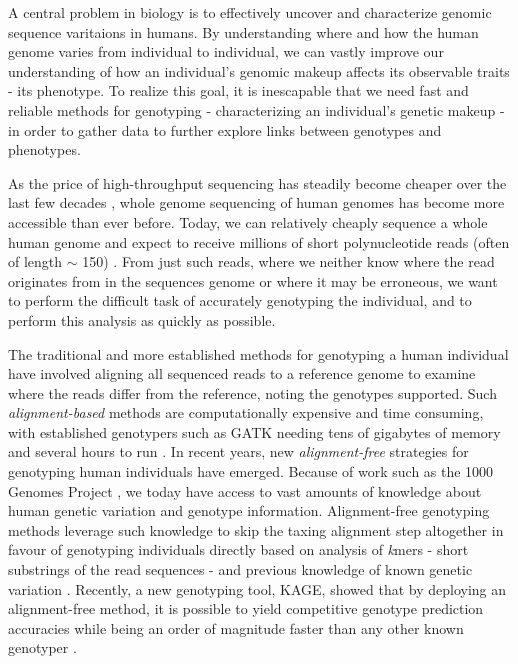 A central problem in biology is to effectively uncover and characterize genomic sequence varitaions in humans.
By understanding where and how the human genome varies from individual to individual, we can vastly improve our understanding of how an individual's genomic makeup affects its observable traits - its phenotype.
To realize this goal, it is inescapable that we need fast and reliable methods for genotyping - characterizing an individual's genetic makeup - in order to gather data to further explore links between genotypes and phenotypes.

As the price of high-throughput sequencing has steadily become cheaper over the last few decades \cite{nhgri_sequencing_cost}, whole genome sequencing of human genomes has become more accessible than ever before.
Today, we can relatively cheaply sequence a whole human genome and expect to receive millions of short polynucleotide reads (often of length $\sim$ 150) \cite{illumina_read_length}.
From just such reads, where we neither know where the read originates from in the sequences genome or where it may be erroneous, we want to perform the difficult task of accurately genotyping the individual, and to perform this analysis as quickly as possible.

The traditional and more established methods for genotyping a human individual have involved aligning all sequenced reads to a reference genome to examine where the reads differ from the reference, noting the genotypes supported.
Such \textit{alignment-based} methods are computationally expensive and time consuming, with established genotypers such as GATK \cite{gatk} needing tens of gigabytes of memory and several hours to run \cite{kage}.
In recent years, new \textit{alignment-free} strategies for genotyping human individuals have emerged.
Because of work such as the 1000 Genomes Project \cite{1000_genomes_project}, we today have access to vast amounts of knowledge about human genetic variation and genotype information.
Alignment-free genotyping methods leverage such knowledge to skip the taxing alignment step altogether in favour of genotyping individuals directly based on analysis of \textit{k}mers - short substrings of the read sequences - and previous knowledge of known genetic variation \cite{kage,malva}.
Recently, a new genotyping tool, KAGE, showed that by deploying an alignment-free method, it is possible to yield competitive genotype prediction accuracies while being an order of magnitude faster than any other known genotyper \cite{kage}.

